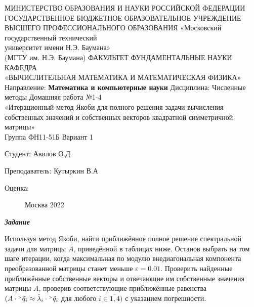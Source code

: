 \documentclass[12pt]{article}
\begin{document}
	
	\begin{center}
		МИНИСТЕРСТВО ОБРАЗОВАНИЯ И НАУКИ РОССИЙСКОЙ ФЕДЕРАЦИИ \\ ГОСУДАРСТВЕННОЕ БЮДЖЕТНОЕ ОБРАЗОВАТЕЛЬНОЕ УЧРЕЖДЕНИЕ \\ 
		ВЫСШЕГО ПРОФЕССИОНАЛЬНОГО ОБРАЗОВАНИЯ
		\vskip 1.5cm
		«Московский государственный технический \\
		университет имени Н.Э. Баумана» \\
		(МГТУ им. Н.Э. Баумана)
		\vskip 1.5cm
		ФАКУЛЬТЕТ ФУНДАМЕНТАЛЬНЫЕ НАУКИ \\
		КАФЕДРА \\
		«ВЫЧИСЛИТЕЛЬНАЯ МАТЕМАТИКА И МАТЕМАТИЧЕСКАЯ ФИЗИКА»
		\vskip 0.4cm
		Направление: \textbf{Математика и компьютерные науки}
		\vskip 0.4cm
		Дисциплина: Численные методы
		\vskip 0.4cm
		Домашняя работа №1-4 \\
		«Итерационный метод Якоби для полного решения задачи вычисления собственных значений
		и собственных векторов квадратной симметричной матрицы» \\
		Группа ФН11-51Б
		\vskip 0.2cm
		Вариант 1
		
		
		\vskip 1.5cm
		\begin{flushright}
			Студент: Авилов О.Д.
			
			\vskip 1.5cm
			
			Преподаватель: Кутыркин В.А
		\end{flushright}
		Оценка:
		
		\begin{figure}[b]
			\begin{center}
				Москва 2022
			\end{center}
		\end{figure}
		
	\end{center}
	
	\newpage
\begin{center}
	\textbf{\textit{Задание}}
\end{center}
Используя метод Якоби, найти приближённое полное решение спектральной задачи для матрицы
$A$, приведённой в таблицах ниже. Останов выбрать на том шаге итерации, когда максимальная по
модулю внедиагональная компонента преобразованной матрицы станет меньше $\varepsilon=0.01$. 
Проверить найденные приближённые собственные векторы и отвечающие им собственные
значения матрицы $A$, проверив соответствующие приближённые равенства $(A \cdot {}^\mathsmaller{>} \tilde{q}_i \approx \tilde \lambda_i \cdot {}^\mathsmaller{>} \tilde{q}_i$ для любого $i \in \overline{1,4})$ с указанием погрешности.
\end{document}
